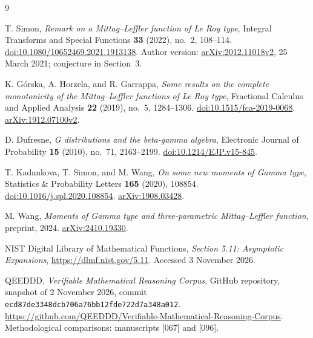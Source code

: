 \documentclass[11pt,a4paper]{article}
\numberwithin{equation}{section}
\theoremstyle{definition}\newtheorem{definition}[theorem]{Definition}
\theoremstyle{remark}\newtheorem{remark}[theorem]{Remark}
\begin{document}
\begin{thebibliography}{9}

T. Simon, \emph{Remark on a Mittag--Leffler function of Le Roy type},
Integral Transforms and Special Functions \textbf{33} (2022), no.~2,
108--114.
\href{https://doi.org/10.1080/10652469.2021.1913138}{doi:10.1080/10652469.2021.1913138}.
Author version: \href{https://arxiv.org/abs/2012.11018v2}{arXiv:2012.11018v2},
25 March 2021; conjecture in Section~3.

K. G\'orska, A. Horzela, and R. Garrappa,
\emph{Some results on the complete monotonicity of the Mittag--Leffler
functions of Le Roy type}, Fractional Calculus and Applied Analysis
\textbf{22} (2019), no.~5, 1284--1306.
\href{https://doi.org/10.1515/fca-2019-0068}{doi:10.1515/fca-2019-0068}.
\href{https://arxiv.org/abs/1912.07100v2}{arXiv:1912.07100v2}.

D. Dufresne, \emph{G distributions and the beta-gamma algebra},
Electronic Journal of Probability \textbf{15} (2010), no.~71,
2163--2199.
\href{https://doi.org/10.1214/EJP.v15-845}{doi:10.1214/EJP.v15-845}.

T. Kadankova, T. Simon, and M. Wang,
\emph{On some new moments of Gamma type},
Statistics \& Probability Letters \textbf{165} (2020), 108854.
\href{https://doi.org/10.1016/j.spl.2020.108854}{doi:10.1016/j.spl.2020.108854}.
\href{https://arxiv.org/abs/1908.03428}{arXiv:1908.03428}.

M. Wang, \emph{Moments of Gamma type and three-parametric
Mittag--Leffler function}, preprint, 2024.
\href{https://arxiv.org/abs/2410.19330}{arXiv:2410.19330}.

NIST Digital Library of Mathematical Functions,
\emph{Section 5.11: Asymptotic Expansions},
\url{https://dlmf.nist.gov/5.11}. Accessed 3 November 2026.

QEEDDD, \emph{Verifiable Mathematical Reasoning Corpus},
GitHub repository, snapshot of 2 November 2026, commit
\texttt{ecd87de3348dcb706a76bb12fde722d7a348a012}.
\url{https://github.com/QEEDDD/Verifiable-Mathematical-Reasoning-Corpus}.
Methodological comparisons: manuscripts [067] and [096].

\end{thebibliography}
\end{document}

